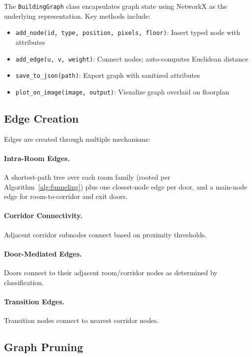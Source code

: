 \documentclass[manuscript,screen,review]{acmart}
\begin{document}
The \texttt{BuildingGraph} class encapsulates graph state using NetworkX as the underlying representation. Key methods include:

\begin{itemize}
    \item \texttt{add\_node(id, type, position, pixels, floor)}: Insert typed node with attributes
    \item \texttt{add\_edge(u, v, weight)}: Connect nodes; auto-computes Euclidean distance
    \item \texttt{save\_to\_json(path)}: Export graph with sanitized attributes
    \item \texttt{plot\_on\_image(image, output)}: Visualize graph overlaid on floorplan
\end{itemize}

\subsection{Edge Creation}
\label{subsec:edges}

Edges are created through multiple mechanisms:

\paragraph{Intra-Room Edges.} A shortest-path tree over each room family (rooted per Algorithm~\ref{alg:funneling}) plus one closest-node edge per door, and a main-node edge for room-to-corridor and exit doors.

\paragraph{Corridor Connectivity.} Adjacent corridor subnodes connect based on proximity thresholds.

\paragraph{Door-Mediated Edges.} Doors connect to their adjacent room/corridor nodes as determined by classification.

\paragraph{Transition Edges.} Transition nodes connect to nearest corridor nodes.

\subsection{Graph Pruning}
\label{subsec:pruning}
\end{document}
